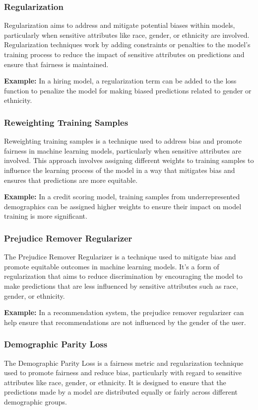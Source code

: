\documentclass[12pt,a4paper,openright,twoside]{book}
\begin{document}
\subsubsection{Regularization}
Regularization  aims to address and mitigate potential biases within models, particularly when sensitive attributes like race, gender, or ethnicity are involved. Regularization techniques work by adding constraints or penalties to the model's training process to reduce the impact of sensitive attributes on predictions and ensure that fairness is maintained. \cite{6137441}

\textbf{Example:} In a hiring model, a regularization term can be added to the loss function to penalize the model for making biased predictions related to gender or ethnicity.

\subsubsection{Reweighting Training Samples}
Reweighting training samples is a technique used to address bias and promote fairness in machine learning models, particularly when sensitive attributes are involved. This approach involves assigning different weights to training samples to influence the learning process of the model in a way that mitigates bias and ensures that predictions are more equitable. \cite{10.1145/3178876.3186133}

\textbf{Example:} In a credit scoring model, training samples from underrepresented demographics can be assigned higher weights to ensure their impact on model training is more significant.

\subsubsection{Prejudice Remover Regularizer}
The Prejudice Remover Regularizer is a technique used to mitigate bias and promote equitable outcomes in machine learning models. It's a form of regularization that aims to reduce discrimination by encouraging the model to make predictions that are less influenced by sensitive attributes such as race, gender, or ethnicity. \cite{10.1007/978-3-642-33486-3_3}

\textbf{Example:} In a recommendation system, the prejudice remover regularizer can help ensure that recommendations are not influenced by the gender of the user.

\subsubsection{Demographic Parity Loss}
The Demographic Parity Loss is a fairness metric and regularization technique used to promote fairness and reduce bias, particularly with regard to sensitive attributes like race, gender, or ethnicity. It is designed to ensure that the predictions made by a model are distributed equally or fairly across different demographic groups. \cite{jiang2022generalized}
\end{document}
